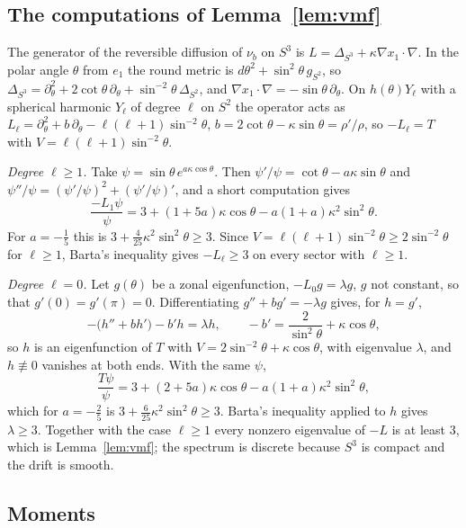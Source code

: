 \documentclass[aps,prd,twocolumn,superscriptaddress,nofootinbib,longbibliography,floatfix,amsmath,amssymb,10pt]{revtex4-2}
\theoremstyle{definition}
\theoremstyle{remark}
\begin{document}
\subsection{The computations of Lemma~\ref{lem:vmf}}

The generator of the reversible diffusion of $\nu_b$ on $S^3$ is
$L=\Delta_{S^3}+\kappa\nabla x_1\cdot\nabla$. In the polar angle $\theta$
from $e_1$ the round metric is $d\theta^2+\sin^2\theta\,g_{S^2}$, so
$\Delta_{S^3}=\partial_\theta^2+2\cot\theta\,\partial_\theta+\sin^{-2}\theta\,
\Delta_{S^2}$, and $\nabla x_1\cdot\nabla=-\sin\theta\,\partial_\theta$. On
$h(\theta)Y_\ell$ with a spherical harmonic $Y_\ell$ of degree $\ell$ on $S^2$
the operator acts as $L_\ell=\partial_\theta^2+b\,\partial_\theta-\ell(\ell+1)
\sin^{-2}\theta$, $b=2\cot\theta-\kappa\sin\theta=\rho'/\rho$, so
$-L_\ell=T$ with $V=\ell(\ell+1)\sin^{-2}\theta$.

\emph{Degree $\ell\ge1$.} Take $\psi=\sin\theta\,e^{a\kappa\cos\theta}$. Then
$\psi'/\psi=\cot\theta-a\kappa\sin\theta$ and
$\psi''/\psi=(\psi'/\psi)^2+(\psi'/\psi)'$, and a short computation gives
\[
\frac{-L_1\psi}\psi=3+(1+5a)\kappa\cos\theta-a(1+a)\kappa^2\sin^2\theta .
\]
For $a=-\frac15$ this is $3+\frac4{25}\kappa^2\sin^2\theta\ge3$. Since
$V=\ell(\ell+1)\sin^{-2}\theta\ge2\sin^{-2}\theta$ for $\ell\ge1$, Barta's
inequality gives $-L_\ell\ge3$ on every sector with $\ell\ge1$.

\emph{Degree $\ell=0$.} Let $g(\theta)$ be a zonal eigenfunction,
$-L_0g=\lambda g$, $g$ not constant, so that $g'(0)=g'(\pi)=0$. Differentiating
$g''+bg'=-\lambda g$ gives, for $h=g'$,
\[
-\bigl(h''+bh'\bigr)-b'h=\lambda h,\qquad -b'=\frac2{\sin^2\theta}+\kappa
\cos\theta,
\]
so $h$ is an eigenfunction of $T$ with $V=2\sin^{-2}\theta+\kappa\cos\theta$,
with eigenvalue $\lambda$, and $h\not\equiv0$ vanishes at both ends. With the
same $\psi$,
\[
\frac{T\psi}\psi=3+(2+5a)\kappa\cos\theta-a(1+a)\kappa^2\sin^2\theta,
\]
which for $a=-\frac25$ is $3+\frac6{25}\kappa^2\sin^2\theta\ge3$. Barta's
inequality applied to $h$ gives $\lambda\ge3$. Together with the case
$\ell\ge1$ every nonzero eigenvalue of $-L$ is at least $3$, which is
Lemma~\ref{lem:vmf}; the spectrum is discrete because $S^3$ is compact and
the drift is smooth.

\subsection{Moments}
\end{document}
